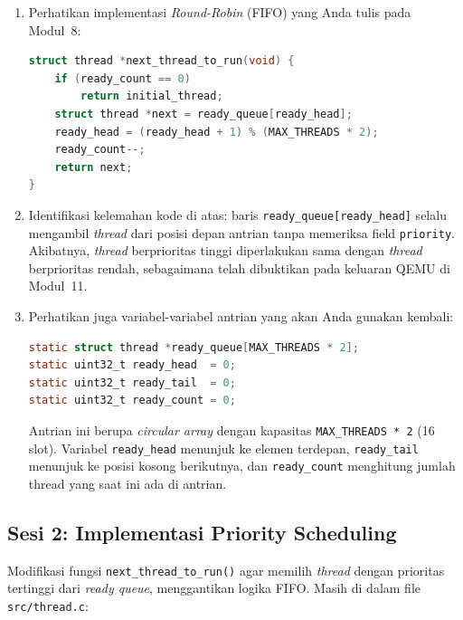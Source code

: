\begin{enumerate}
	\item Perhatikan implementasi \textit{Round-Robin} (FIFO) yang Anda tulis pada Modul~8:
	      \begin{lstlisting}[language=C, caption={Implementasi Round-Robin saat ini di next\_thread\_to\_run()}]
struct thread *next_thread_to_run(void) {
    if (ready_count == 0)
        return initial_thread;
    struct thread *next = ready_queue[ready_head];
    ready_head = (ready_head + 1) % (MAX_THREADS * 2);
    ready_count--;
    return next;
}
    \end{lstlisting}

	\item Identifikasi kelemahan kode di atas: baris \texttt{ready\_queue[ready\_head]} selalu mengambil \textit{thread} dari posisi depan antrian tanpa memeriksa field \texttt{priority}. Akibatnya, \textit{thread} berprioritas tinggi diperlakukan sama dengan \textit{thread} berprioritas rendah, sebagaimana telah dibuktikan pada keluaran QEMU di Modul~11.

	\item Perhatikan juga variabel-variabel antrian yang akan Anda gunakan kembali:
	      \begin{lstlisting}[language=C, caption={Variabel antrian thread di thread.c (sudah disediakan)}]
static struct thread *ready_queue[MAX_THREADS * 2];
static uint32_t ready_head  = 0;
static uint32_t ready_tail  = 0;
static uint32_t ready_count = 0;
    \end{lstlisting}
	      Antrian ini berupa \textit{circular array} dengan kapasitas \texttt{MAX\_THREADS * 2} (16 slot). Variabel \texttt{ready\_head} menunjuk ke elemen terdepan, \texttt{ready\_tail} menunjuk ke posisi kosong berikutnya, dan \texttt{ready\_count} menghitung jumlah thread yang saat ini ada di antrian.
\end{enumerate}

\subsection{Sesi 2: Implementasi Priority Scheduling}
\label{sec:m12-sesi-2}

Modifikasi fungsi \texttt{next\_thread\_to\_run()} agar memilih \textit{thread} dengan prioritas tertinggi dari \textit{ready queue}, menggantikan logika FIFO. Masih di dalam file \texttt{src/thread.c}:

